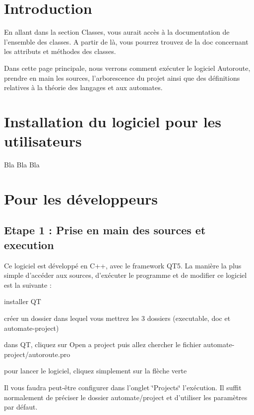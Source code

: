 \hypertarget{index_intro_sec}{}\section{Introduction}\label{index_intro_sec}
En allant dans la section Classes, vous aurait accès à la documentation de l'ensemble des classes. A partir de là, vous pourrez trouvez de la doc concernant les attributs et méthodes des classes.

Dans cette page principale, nous verrons comment exécuter le logiciel Autoroute, prendre en main les sources, l'arborescence du projet ainsi que des définitions relatives à la théorie des langages et aux automates.\hypertarget{index_install_sec}{}\section{Installation du logiciel pour les utilisateurs}\label{index_install_sec}
Bla Bla Bla\hypertarget{index_dev_sec}{}\section{Pour les développeurs}\label{index_dev_sec}
\hypertarget{index_etape1}{}\subsection{Etape 1 \-: Prise en main des sources et execution}\label{index_etape1}
Ce logiciel est développé en C++, avec le framework Q\-T5. La manière la plus simple d'accéder aux sources, d'exécuter le programme et de modifier ce logiciel est la suivante \-:
\begin{DoxyItemize}
\item installer Q\-T
\item créer un dossier dans lequel vous mettrez les 3 dossiers (executable, doc et automate-\/project)
\item dans Q\-T, cliquez sur Open a project puis allez chercher le fichier automate-\/project/autoroute.\-pro
\item pour lancer le logiciel, cliquez simplement sur la flèche verte
\end{DoxyItemize}

Il vous faudra peut-\/être configurer dans l'onglet \char`\"{}\-Projects\char`\"{} l'exécution. Il suffit normalement de préciser le dossier automate/project et d'utiliser les paramètres par défaut.

